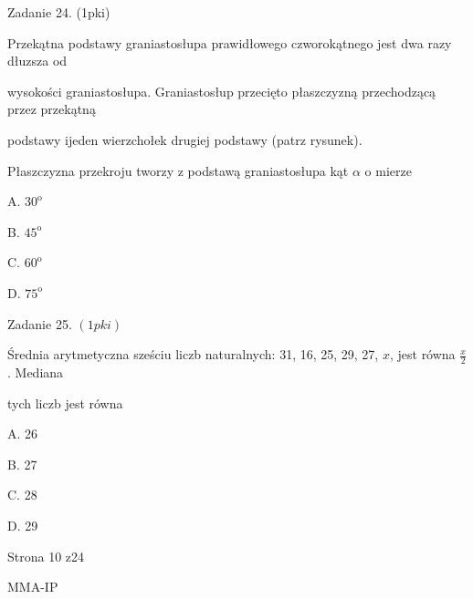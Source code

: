 \documentclass[a4paper,12pt]{article}
\begin{document}
Zadanie 24. (1pki)

Przekątna podstawy graniastosłupa prawidłowego czworokątnego jest dwa razy dłuzsza od

wysokości graniastosłupa. Graniastosłup przecięto płaszczyzną przechodzącą przez przekątną

podstawy ijeden wierzchołek drugiej podstawy (patrz rysunek).

Płaszczyzna przekroju tworzy z podstawą graniastosłupa kąt $\alpha$ o mierze

A. $30^{\mathrm{o}}$

B. $45^{\mathrm{o}}$

C. $60^{\mathrm{o}}$

D. $75^{\mathrm{o}}$

Zadanie 25. $(1pki)$

Średnia arytmetyczna sześciu liczb naturalnych: 31, 16, 25, 29, 27, $x$, jest równa $\displaystyle \frac{x}{2}$. Mediana

tych liczb jest równa

A. 26

B. 27

C. 28

D. 29

Strona 10 z24

MMA-IP
\end{document}
